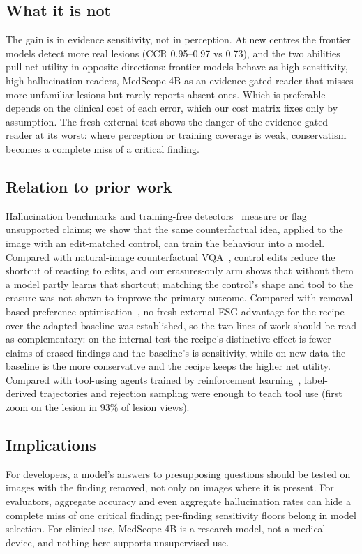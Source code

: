 \documentclass[11pt]{article}
\begin{document}
\subsection{What it is not}
The gain is in evidence sensitivity, not in perception. At new centres the frontier models detect more real lesions (CCR 0.95--0.97 vs 0.73), and the two abilities pull net utility in opposite directions: frontier models behave as high-sensitivity, high-hallucination readers, MedScope-4B as an evidence-gated reader that misses more unfamiliar lesions but rarely reports absent ones. Which is preferable depends on the clinical cost of each error, which our cost matrix fixes only by assumption. The fresh external test shows the danger of the evidence-gated reader at its worst: where perception or training coverage is weak, conservatism becomes a complete miss of a critical finding.

\subsection{Relation to prior work}
Hallucination benchmarks and training-free detectors~\cite{pope,cares,medhallmark,medvh,medheval,coev,cvgu} measure or flag unsupported claims; we show that the same counterfactual idea, applied to the image with an edit-matched control, can train the behaviour into a model. Compared with natural-image counterfactual VQA~\cite{causalvqa}, control edits reduce the shortcut of reacting to edits, and our erasures-only arm shows that without them a model partly learns that shortcut; matching the control's shape and tool to the erasure was not shown to improve the primary outcome. Compared with removal-based preference optimisation~\cite{removed}, no fresh-external ESG advantage for the recipe over the adapted baseline was established, so the two lines of work should be read as complementary: on the internal test the recipe's distinctive effect is fewer claims of erased findings and the baseline's is sensitivity, while on new data the baseline is the more conservative and the recipe keeps the higher net utility. Compared with tool-using agents trained by reinforcement learning~\cite{deepeyes,pixelreasoner,mmedagent,mmedagentrl}, label-derived trajectories and rejection sampling were enough to teach tool use (first zoom on the lesion in 93\% of lesion views).

\subsection{Implications}
For developers, a model's answers to presupposing questions should be tested on images with the finding removed, not only on images where it is present. For evaluators, aggregate accuracy and even aggregate hallucination rates can hide a complete miss of one critical finding; per-finding sensitivity floors belong in model selection. For clinical use, MedScope-4B is a research model, not a medical device, and nothing here supports unsupervised use.
\end{document}
